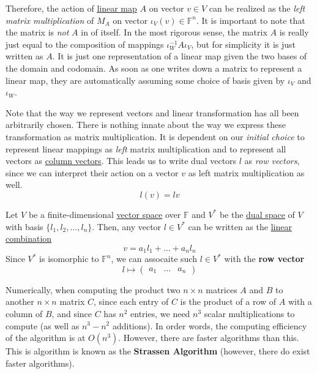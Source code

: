 	Therefore, the action of \hyperref[def:linear_map]{linear map} $A$ on vector $v \in V$ can be realized as the \textit{left matrix multiplication} of $M_A$ on vector $\iota_V (v) \in \mathbb{F}^n$. It is important to note that the matrix is \textit{not} $A$ in of itself. In the most rigorous sense, the matrix $A$ is really just equal to the composition of mappings $\iota_W^{-1} A \iota_V$, but for simplicity it is just written as $A$. It is just one representation of a linear map given the two bases of the domain and codomain. As soon as one writes down a matrix to represent a linear map, they are automatically assuming some choice of basis given by $\iota_V$ and $\iota_W$. 

	Note that the way we represent vectors and linear transformation has all been arbitrarily chosen. There is nothing innate about the way we express these transformation as matrix multiplication. It is dependent on our \textit{initial choice} to represent linear mappings as \textit{left} matrix multiplication and to represent all vectors as \hyperref[def:column-vector]{column vectors}. This leads us to write dual vectors $l$ as \textit{row vectors}, since we can interpret their action on a vector $v$ as left matrix multiplication as well. 	
	\begin{equation}
	  l(v) = lv
	\end{equation}

	\begin{definition}
	  \label{def:row-vector}
		Let $V$ be a finite-dimensional \hyperref[def:vector-space]{vector space} over $\mathbb{F}$ and $V^\ast$ be the \hyperref[def:dual-space]{dual space} of $V$ with basis $\{l_1, l_2, \ldots, l_n\}$. Then, any vector $l \in V^\ast$ can be written as the \hyperref[def:linear-combination]{linear combination} 
		\begin{equation}
		  v = a_1 l_1 + \ldots + a_n l_n
		\end{equation}
		Since $V^\ast$ is isomorphic to $\mathbb{F}^n$, we can assocaite such $l \in V^\ast$ with the \textbf{row vector} 
		\begin{equation}
			l \mapsto \begin{pmatrix} a_1 & \ldots & a_n \end{pmatrix}
		\end{equation}
	\end{definition}

  Numerically, when computing the product two $n \times n$ matrices $A$ and $B$ to another $n \times n$ matrix $C$, since each entry of $C$ is the product of a row of $A$ with a column of $B$, and since $C$ has $n^2$ entries, we need $n^3$ scalar multiplications to compute (as well as $n^3 - n^2$ additions). In order words, the computing efficiency of the algorithm is at $O(n^3)$. However, there are faster algorithms than this. This is algorithm is known as the \textbf{Strassen Algorithm} (however, there do exist faster algorithms). 

